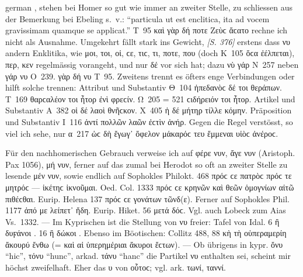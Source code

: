 \begin{otherlanguage*}{german}
,  stehen bei Homer so gut wie immer an zweiter Stelle, zu schliessen aus der Bemerkung bei Ebeling s.~v.: “particula ut est enclitica, ita ad vocem gravissimam quamque se applicat.” Τ~95 καὶ γὰρ δή  ποτε Ζεὺϲ ἄϲατο rechne ich nicht als Ausnahme. Umgekehrt fällt stark ins Gewicht, \hypertarget{p376}{\emph{[S. 376]}}\label{p376} erstens dass νυ andern Enklitika, wie μοι, τοι, οἱ, ϲε, τιϲ, τι, ποτε, που (doch Κ~105 ὅϲα  ἐέλπεται), περ, κεν regelmässig vorangeht, und nur δέ vor sich hat; dazu νὺ γάρ Ν~257 neben γάρ νυ Ο~239. γὰρ δή νυ Τ~95. Zweitens trennt es öfters enge Verbindungen oder hilft solche trennen: Attribut und Substantiv Θ~104 ἠπεδανὸϲ δέ  τοι θεράπων. Τ~169 θαρϲαλέον  τοι ἦτορ ἐνὶ φρεϲίν. Ω~205 = 521 ϲιδήρειόν  τοι ἦτορ. Artikel und Substantiv Α~382 οἱ δέ  λαοὶ θνῆϲκον. Χ~405 ἡ δέ  μήτηρ τίλλε κόμην. Präposition und Substantiv Ι~116 ἀντί  πολλῶν λαῶν ἐϲτὶν ἀνήρ. Gegen die Regel verstösst, so viel ich sehe, nur α~217 ὡϲ δὴ ἔγωγ᾽ ὄφελον μάκαρόϲ  τευ ἔμμεναι υἱὸϲ ἀνέροϲ.

Für den nachhomerischen Gebrauch verweise ich auf φέρε νυν, ἄγε νυν (Aristoph. Pax 1056), μή νυν, ferner auf das zumal bei Herodot so oft an zweiter Stelle zu lesende μέν νυν, sowie endlich auf Sophokles Philokt. 468 πρόϲ  ϲε πατρὸϲ πρόϲ τε μητρόϲ — ἱκέτηϲ ἱκνοῦμαι. Oed. Col. 1333 πρόϲ  ϲε κρηνῶν καὶ θεῶν ὁμογνίων αἰτῶ πιθέϲθαι. Eurip. Helena 137 πρόϲ  ϲε γονάτων τῶνδ(ε). Ferner auf Sophokles Phil. 1177 ἀπό  με λείπετ᾽ ἤδη. Eurip. Hiket. 56 μετά  δόϲ. Vgl. auch Lobeck zum Aias Vs.~1332. — Im Kyprischen ist die Stellung von νυ freier: Tafel von Idal. 6 ἢ δυϝάνοι . 16 ἢ δώκοι . Ebenso im Böotischen: Collitz 488, 88 κὴ τὴ οὑπεραμερίη ἄκουρύ  ἔνθω (= καὶ αἱ ὑπερημέριαι ἄκυροι ἔϲτων). — Ob übrigens in kypr. ὄνυ “hic”, τόνυ “hunc”, arkad. τάνυ “hanc” die Partikel νυ enthalten sei, scheint mir höchst zweifelhaft. Eher das υ von οὗτοϲ; vgl. ark. τωνί, ταννί.


\end{otherlanguage*}
